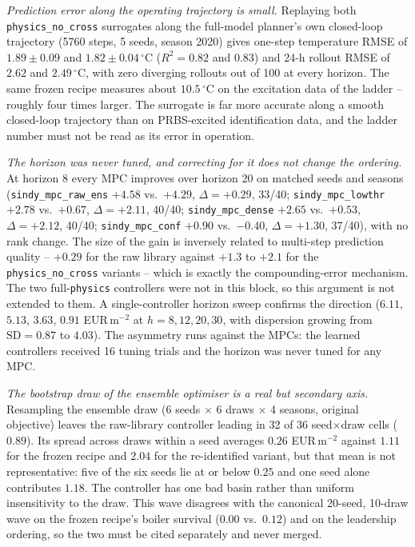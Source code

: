 \textit{Prediction error along the operating trajectory is small.} Replaying both
\texttt{physics\_no\_cross}
surrogates along the full-model planner's own closed-loop trajectory (5760 steps, 5 seeds,
season 2020) gives one-step temperature RMSE of $1.89\pm0.09$ and $1.82\pm0.04\,^\circ$C
($R^2 = 0.82$ and $0.83$) and 24-h rollout RMSE of $2.62$ and $2.49\,^\circ$C, with zero
diverging rollouts out of 100 at every horizon. The same frozen recipe measures about
$10.5\,^\circ$C on the excitation data of the ladder -- roughly four times larger. The
surrogate is far more accurate along a smooth closed-loop trajectory than on PRBS-excited
identification data, and the ladder number must not be read as its error in operation.

\textit{The horizon was never tuned, and correcting for it does not change the ordering.}
At horizon 8 every MPC improves over horizon 20 on matched seeds and seasons
(\texttt{sindy\_mpc\_raw\_ens} $+4.58$ vs.\ $+4.29$, $\Delta=+0.29$, 33/40;
\texttt{sindy\_mpc\_lowthr} $+2.78$ vs.\ $+0.67$, $\Delta=+2.11$, 40/40;
\texttt{sindy\_mpc\_dense} $+2.65$ vs.\ $+0.53$, $\Delta=+2.12$, 40/40;
\texttt{sindy\_mpc\_conf} $+0.90$ vs.\ $-0.40$, $\Delta=+1.30$, 37/40), with no rank
change. The size of the gain is inversely related to multi-step prediction quality -- $+0.29$
for the raw library against $+1.3$ to $+2.1$ for the \texttt{physics\_no\_cross} variants
-- which is exactly the compounding-error mechanism. The two full-\texttt{physics}
controllers were not in this block, so this argument is not extended to them. A single-controller horizon sweep confirms the direction
($6.11$, $5.13$, $3.63$, $0.91$ EUR\,m$^{-2}$ at $h=8,12,20,30$, with dispersion growing
from $\text{SD}=0.87$ to $4.03$). The asymmetry runs against the MPCs: the learned
controllers received 16 tuning trials and the horizon was never tuned for any MPC.

\textit{The bootstrap draw of the ensemble optimiser is a real but secondary axis.}
Resampling the ensemble draw (6 seeds $\times$ 6 draws $\times$ 4 seasons, original
objective) leaves the raw-library controller leading in 32 of 36 seed$\times$draw cells
($0.89$). Its spread across draws within a seed averages $0.26$ EUR\,m$^{-2}$ against
$1.11$ for the frozen recipe and $2.04$ for the re-identified variant, but that mean is
not representative: five of the six seeds lie at or below $0.25$ and one seed alone
contributes $1.18$. The controller has one bad basin rather than uniform insensitivity to
the draw. This wave disagrees with the canonical 20-seed, 10-draw wave on the frozen
recipe's boiler survival ($0.00$ vs.\ $0.12$) and on the leadership ordering, so the two
must be cited separately and never merged.

